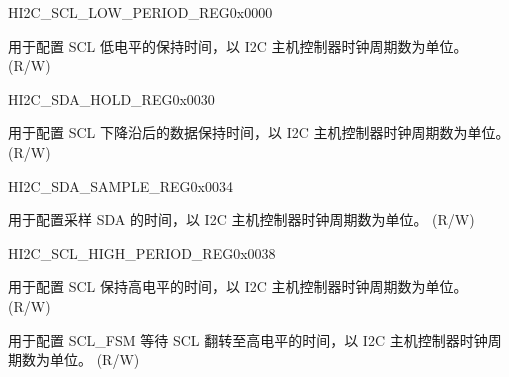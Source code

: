 \begin{register}{H}{I2C\_SCL\_LOW\_PERIOD\_REG}{0x0000}\label{regdesc:I2CSCLLOWPERIODREG}
%
%
\regnewline%
\begin{regdesc}\begin{reglist}
\label{fielddesc:I2CSCLLOWPERIOD}\item [I2C\_SCL\_LOW\_PERIOD] 用于配置 SCL 低电平的保持时间，以 I2C 主机控制器时钟周期数为单位。 (R/W)
\end{reglist}\end{regdesc}
\end{register}


\begin{register}{H}{I2C\_SDA\_HOLD\_REG}{0x0030}\label{regdesc:I2CSDAHOLDREG}
%
%
\regnewline%
\begin{regdesc}\begin{reglist}
\label{fielddesc:I2CSDAHOLDTIME}\item [I2C\_SDA\_HOLD\_TIME] 用于配置 SCL 下降沿后的数据保持时间，以 I2C 主机控制器时钟周期数为单位。 (R/W)
\end{reglist}\end{regdesc}
\end{register}


\begin{register}{H}{I2C\_SDA\_SAMPLE\_REG}{0x0034}\label{regdesc:I2CSDASAMPLEREG}
%
%
\regnewline%
\begin{regdesc}\begin{reglist}
\label{fielddesc:I2CSDASAMPLETIME}\item [I2C\_SDA\_SAMPLE\_TIME] 用于配置采样 SDA 的时间，以 I2C 主机控制器时钟周期数为单位。 (R/W)
\end{reglist}\end{regdesc}
\end{register}


\begin{register}{H}{I2C\_SCL\_HIGH\_PERIOD\_REG}{0x0038}\label{regdesc:I2CSCLHIGHPERIODREG}
%
%
%
\regnewline%
\begin{regdesc}\begin{reglist}
\label{fielddesc:I2CSCLHIGHPERIOD}\item [I2C\_SCL\_HIGH\_PERIOD] 用于配置 SCL 保持高电平的时间，以 I2C 主机控制器时钟周期数为单位。 (R/W)
\label{fielddesc:I2CSCLWAITHIGHPERIOD}\item [I2C\_SCL\_WAIT\_HIGH\_PERIOD] 用于配置 SCL\_FSM 等待 SCL 翻转至高电平的时间，以 I2C 主机控制器时钟周期数为单位。 (R/W)
\end{reglist}\end{regdesc}
\end{register}


